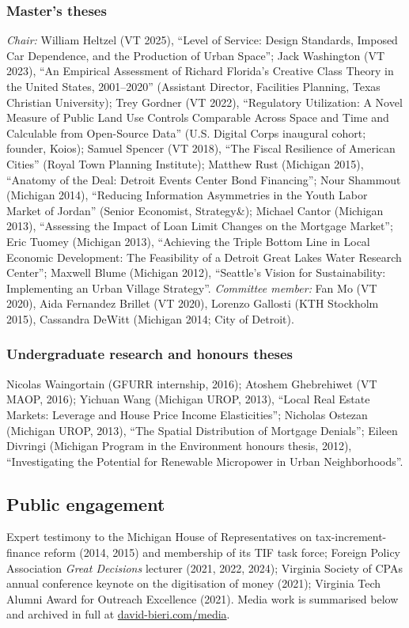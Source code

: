 \documentclass[letter,11pt]{article}
\begin{document}
\subsubsection*{Master's theses}
\noindent\emph{Chair:} William Heltzel (VT 2025), \enquote{Level of Service: Design Standards, Imposed Car Dependence, and the Production of Urban Space}; Jack Washington (VT 2023), \enquote{An Empirical Assessment of Richard Florida's Creative Class Theory in the United States, 2001--2020} (Assistant Director, Facilities Planning, Texas Christian University); Trey Gordner (VT 2022), \enquote{Regulatory Utilization: A Novel Measure of Public Land Use Controls Comparable Across Space and Time and Calculable from Open-Source Data} (U.S. Digital Corps inaugural cohort; founder, Koios); Samuel Spencer (VT 2018), \enquote{The Fiscal Resilience of American Cities} (Royal Town Planning Institute); Matthew Rust (Michigan 2015), \enquote{Anatomy of the Deal: Detroit Events Center Bond Financing}; Nour Shammout (Michigan 2014), \enquote{Reducing Information Asymmetries in the Youth Labor Market of Jordan} (Senior Economist, Strategy\&); Michael Cantor (Michigan 2013), \enquote{Assessing the Impact of Loan Limit Changes on the Mortgage Market}; Eric Tuomey (Michigan 2013), \enquote{Achieving the Triple Bottom Line in Local Economic Development: The Feasibility of a Detroit Great Lakes Water Research Center}; Maxwell Blume (Michigan 2012), \enquote{Seattle's Vision for Sustainability: Implementing an Urban Village Strategy}. \emph{Committee member:} Fan Mo (VT 2020), Aida Fernandez Brillet (VT 2020), Lorenzo Gallosti (KTH Stockholm 2015), Cassandra DeWitt (Michigan 2014; City of Detroit).

\subsubsection*{Undergraduate research and honours theses}
\noindent Nicolas Waingortain (GFURR internship, 2016); Atoshem Ghebrehiwet (VT MAOP, 2016); Yichuan Wang (Michigan UROP, 2013), \enquote{Local Real Estate Markets: Leverage and House Price Income Elasticities}; Nicholas Ostezan (Michigan UROP, 2013), \enquote{The Spatial Distribution of Mortgage Denials}; Eileen Divringi (Michigan Program in the Environment honours thesis, 2012), \enquote{Investigating the Potential for Renewable Micropower in Urban Neighborhoods}.

\subsection*{Public engagement}
\noindent Expert testimony to the Michigan House of Representatives on tax-increment-finance reform (2014, 2015) and membership of its TIF task force; Foreign Policy Association \emph{Great Decisions} lecturer (2021, 2022, 2024); Virginia Society of CPAs annual conference keynote on the digitisation of money (2021); Virginia Tech Alumni Award for Outreach Excellence (2021). Media work is summarised below and archived in full at \href{https://david-bieri.com/media.html}{david-bieri.com/media}.
\end{document}
